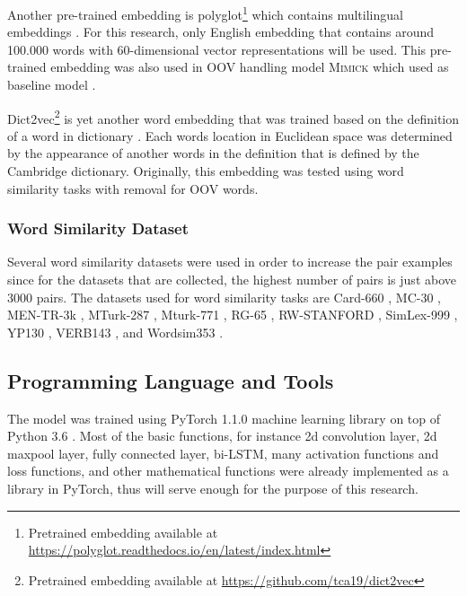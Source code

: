             Another pre-trained embedding is
            polyglot\footnote{Pretrained embedding available at
            \url{https://polyglot.readthedocs.io/en/latest/index.html}}
             which contains multilingual embeddings
            \citep{polyglot2013alrfou}. For this research, only
            English embedding that contains around 100.000 words with
            60-dimensional vector representations will be used. This
            pre-trained embedding was also used in OOV handling model
            \textsc{Mimick} which used as baseline model
            \citep{mimicking2017Pinter}.

            Dict2vec\footnote{Pretrained embedding available at
            \url{https://github.com/tca19/dict2vec}} is yet another
            word embedding that was trained based on the definition of
            a word in dictionary \citep{dict2vect2017tissier}. Each
            words location in Euclidean space was determined by the
            appearance of another words in the definition that is
            defined by the Cambridge dictionary. Originally, this
            embedding was tested using word similarity tasks with
            removal for OOV words.

        \subsubsection{Word Similarity Dataset}
            Several word similarity datasets were used in order to
            increase the pair examples since for the datasets that are
            collected, the highest number of pairs is just above 3000
            pairs. The datasets used for word similarity tasks are
            Card-660 \citep{card660:pilehvar-etal:2018}, MC-30
            \citep{mc30:strongContextualHypothesis}, MEN-TR-3k
            \citep{mentr3k:bruni-etal-2012-distributional}, MTurk-287
            \citep{mturk287:Radinsky:2011:WTC:1963405.1963455},
            Mturk-771
            \citep{mturk771:Halawi:2012:LLW:2339530.2339751}, RG-65
            \citep{rg65:Rubenstein:1965:CCS:365628.365657},
            RW-STANFORD \citep{rw:luong-etal-2013-better}, SimLex-999
            \citep{simlex999:hill2014}, YP130
            \citep{yp130:inproceedings}, VERB143
            \citep{vp143:baker-etal-2014-unsupervised}, and Wordsim353
            \citep{wordsim353:2002:PSC:503104.503110}.

    \subsection{Programming Language and Tools}
        The model was trained using PyTorch 1.1.0 machine learning
        library on top of Python 3.6 \citep{pytorch2017paszke}. Most
        of the basic functions, for instance 2d convolution layer, 2d
        maxpool layer, fully connected layer, bi-LSTM, many
        activation functions and loss functions, and other mathematical
        functions were already implemented as a library in PyTorch,
        thus will serve enough for the purpose of this research.

